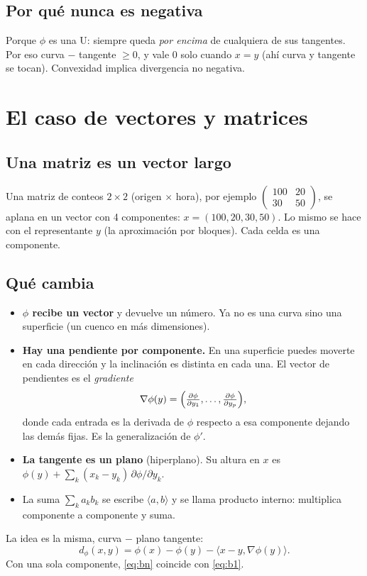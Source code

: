 \documentclass[11pt,a4paper]{article}
\begin{document}
\subsection{Por qué nunca es negativa}

Porque $\phi$ es una U: siempre queda \emph{por encima} de cualquiera de sus
tangentes. Por eso curva $-$ tangente $\ge 0$, y vale $0$ solo cuando $x=y$
(ahí curva y tangente se tocan). Convexidad implica divergencia no negativa.

\section{El caso de vectores y matrices}

\subsection{Una matriz es un vector largo}

Una matriz de conteos $2\times 2$ (origen $\times$ hora), por ejemplo
$\begin{pmatrix}100&20\\30&50\end{pmatrix}$, se aplana en un vector con 4
componentes: $x=(100,20,30,50)$. Lo mismo se hace con el representante $y$ (la
aproximación por bloques). Cada celda es una componente.

\subsection{Qué cambia}

\begin{itemize}
  \item \textbf{$\phi$ recibe un vector} y devuelve un número. Ya no es una curva
  sino una superficie (un \guillemotleft{}cuenco\guillemotright{} en más dimensiones).
  \item \textbf{Hay una pendiente por componente.} En una superficie puedes
  moverte en cada dirección y la inclinación es distinta en cada una. El vector
  de pendientes es el \emph{gradiente}
  \[
    \nabla\phi(y)=\Bigl(\tfrac{\partial\phi}{\partial y_1},\dots,
    \tfrac{\partial\phi}{\partial y_p}\Bigr),
  \]
  donde cada entrada es la derivada de $\phi$ respecto a esa componente dejando
  las demás fijas. Es la generalización de $\phi'$.
  \item \textbf{La tangente es un plano} (hiperplano). Su altura en $x$ es
  $\phi(y)+\sum_k (x_k-y_k)\,\partial\phi/\partial y_k$.
  \item La suma $\sum_k a_k b_k$ se escribe $\langle a,b\rangle$ y se llama
  producto interno: multiplica componente a componente y suma.
\end{itemize}
La idea es la misma, curva $-$ plano tangente:
\begin{equation}\label{eq:bn}
  d_\phi(x,y)=\phi(x)-\phi(y)-\langle x-y,\nabla\phi(y)\rangle .
\end{equation}
Con una sola componente, \eqref{eq:bn} coincide con \eqref{eq:b1}.
\end{document}
